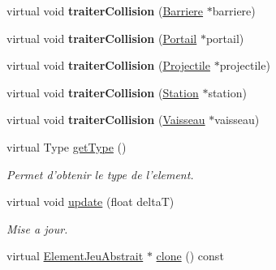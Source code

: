 \begin{DoxyCompactItemize}
\item 
\hypertarget{class_barriere_aceff2c03891e91ab4e6e43785d0680ee}{virtual void {\bfseries traiter\-Collision} (\hyperlink{class_barriere}{Barriere} $\ast$barriere)}\label{class_barriere_aceff2c03891e91ab4e6e43785d0680ee}

\item 
\hypertarget{class_barriere_a253f995214d58262ef072d47f705573b}{virtual void {\bfseries traiter\-Collision} (\hyperlink{class_portail}{Portail} $\ast$portail)}\label{class_barriere_a253f995214d58262ef072d47f705573b}

\item 
\hypertarget{group__inf2990_gaa09a3ee20ab537a1c4f37ad3edcb55b6}{virtual void {\bfseries traiter\-Collision} (\hyperlink{class_projectile}{Projectile} $\ast$projectile)}\label{group__inf2990_gaa09a3ee20ab537a1c4f37ad3edcb55b6}

\item 
\hypertarget{class_barriere_a321838647c5e214b6c0f7374b23f7dfa}{virtual void {\bfseries traiter\-Collision} (\hyperlink{class_station}{Station} $\ast$station)}\label{class_barriere_a321838647c5e214b6c0f7374b23f7dfa}

\item 
\hypertarget{group__inf2990_ga09b425373e5f02b1cbe200e71e006cfd}{virtual void {\bfseries traiter\-Collision} (\hyperlink{class_vaisseau}{Vaisseau} $\ast$vaisseau)}\label{group__inf2990_ga09b425373e5f02b1cbe200e71e006cfd}

\item 
virtual Type \hyperlink{group__inf2990_ga9a0160da5089efa38867ad45782ae40d}{get\-Type} ()
\begin{DoxyCompactList}\small\item\em Permet d'obtenir le type de l'element. \end{DoxyCompactList}\item 
virtual void \hyperlink{group__inf2990_ga171ffac6e81bf3bbd884212945946354}{update} (float delta\-T)
\begin{DoxyCompactList}\small\item\em Mise a jour. \end{DoxyCompactList}\item 
\hypertarget{group__inf2990_gad0aa2475444721471fc452d1b6f9438e}{virtual \hyperlink{class_element_jeu_abstrait}{Element\-Jeu\-Abstrait} $\ast$ \hyperlink{group__inf2990_gad0aa2475444721471fc452d1b6f9438e}{clone} () const }\label{group__inf2990_gad0aa2475444721471fc452d1b6f9438e}


\end{DoxyCompactItemize}

